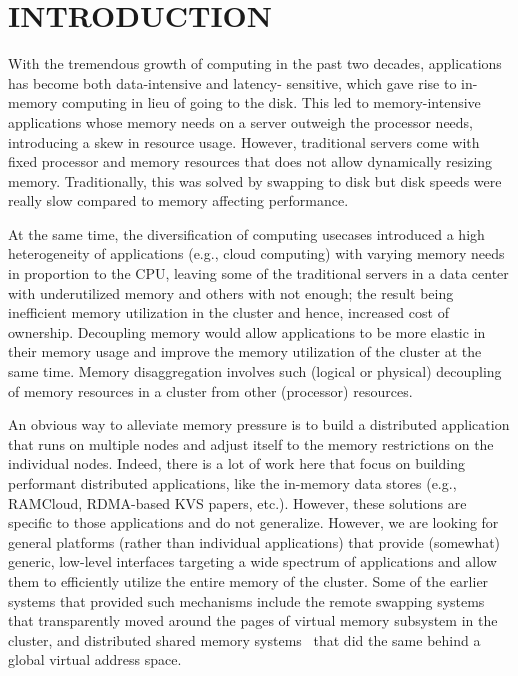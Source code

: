 \section{INTRODUCTION}
\label{sec:intro}

With the tremendous growth of computing in the past two decades, 
applications has become both data-intensive and latency-
sensitive, which gave rise to in-memory computing in lieu 
of going to the disk. This led to memory-intensive 
applications whose memory needs on a server outweigh the 
processor needs, introducing a skew in resource usage.
However, traditional servers come with fixed processor 
and memory resources that does not allow dynamically
resizing memory. Traditionally, this was solved by swapping 
to disk but disk speeds were really slow compared to memory 
affecting performance. 

At the same time, the diversification of computing usecases 
introduced a high heterogeneity of applications (e.g., cloud 
computing) with varying memory needs in proportion to 
the CPU, leaving some of the traditional servers in a data center  
with underutilized memory and others with not enough; the result
being inefficient memory utilization in the cluster and hence,
increased cost of ownership. Decoupling memory would allow 
applications to be more elastic in their memory usage and 
improve the memory utilization of the cluster at the same time.
Memory disaggregation involves such (logical or physical) 
decoupling of memory resources in a cluster from other 
(processor) resources. 

An obvious way to alleviate memory pressure is to build a 
distributed application that runs on multiple nodes and 
adjust itself to the memory restrictions on the individual 
nodes. Indeed, there is a lot of work here that focus on building 
performant distributed applications, like the in-memory 
data stores (e.g., RAMCloud, RDMA-based KVS papers, etc.). 
However, these solutions are specific to those applications and 
do not generalize. However, we are looking for general 
platforms (rather than individual applications) that provide 
(somewhat) generic, low-level interfaces targeting a wide 
spectrum of applications and allow them to efficiently utilize 
the entire memory of the cluster. Some of the earlier 
systems that provided such mechanisms include the remote 
swapping systems~\cite{gms,cashmere} that transparently moved 
around the pages of virtual memory subsystem in the cluster,
and distributed shared memory systems~\cite{treadmarks,dsm1}
that did the same behind a global virtual address space.

